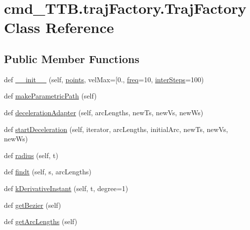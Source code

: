 \hypertarget{classcmd__TTB_1_1trajFactory_1_1TrajFactory}{}\section{cmd\+\_\+\+T\+T\+B.\+traj\+Factory.\+Traj\+Factory Class Reference}
\label{classcmd__TTB_1_1trajFactory_1_1TrajFactory}
\subsection*{Public Member Functions}
\begin{DoxyCompactItemize}
\item 
def \hyperlink{classcmd__TTB_1_1trajFactory_1_1TrajFactory_a1cfbf1b87291564fee20895c3eda234f}{\+\_\+\+\_\+init\+\_\+\+\_\+} (self, \hyperlink{namespacecmd__TTB_1_1trajFactory_a155b2c6da96a917f0ac2ad1b45e68f65}{points}, vel\+Max=\mbox{[}0., \hyperlink{namespacecmd__TTB_1_1trajFactory_abb2e2587a58c4fc35dd18e79526c3a67}{freq}=10, \hyperlink{classcmd__TTB_1_1trajFactory_1_1TrajFactory_a17391e139222a91451f87e07e96f0952}{inter\+Steps}=100)
\item 
def \hyperlink{classcmd__TTB_1_1trajFactory_1_1TrajFactory_ade69855daa93371b1a2a2540de43af2e}{make\+Parametric\+Path} (self)
\item 
def \hyperlink{classcmd__TTB_1_1trajFactory_1_1TrajFactory_a0813e84946f5fa7ea8db2eec70fe74ed}{deceleration\+Adapter} (self, arc\+Lengths, new\+Ts, new\+Vs, new\+Ws)
\item 
def \hyperlink{classcmd__TTB_1_1trajFactory_1_1TrajFactory_a4760d93eefb0aff891b61e4005e53e32}{start\+Deceleration} (self, iterator, arc\+Lengths, initial\+Arc, new\+Ts, new\+Vs, new\+Ws)
\item 
def \hyperlink{classcmd__TTB_1_1trajFactory_1_1TrajFactory_ae79e897f8631e4e1bbf639d5951caec5}{radius} (self, t)
\item 
def \hyperlink{classcmd__TTB_1_1trajFactory_1_1TrajFactory_a9587e7e6861ce7150df8e05372f86b26}{findt} (self, s, arc\+Lengths)
\item 
def \hyperlink{classcmd__TTB_1_1trajFactory_1_1TrajFactory_a804100550f047f3e036df7839f5e1d72}{k\+Derivative\+Instant} (self, t, degree=1)
\item 
def \hyperlink{classcmd__TTB_1_1trajFactory_1_1TrajFactory_a0472b558a80a4fe4dd8106f6a89e6562}{get\+Bezier} (self)
\item 
def \hyperlink{classcmd__TTB_1_1trajFactory_1_1TrajFactory_ad8e62bca54b4165eea3c677690c89efc}{get\+Arc\+Lengths} (self)

\end{DoxyCompactItemize}
